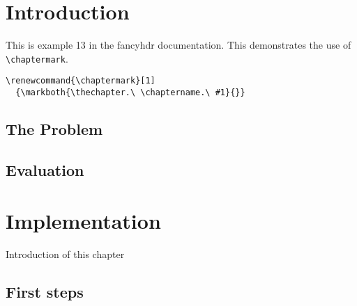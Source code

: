 \documentclass{book}
\renewcommand{\chaptermark}[1]
  {\markboth{\thechapter.\ \chaptername.\ #1}{}}
\begin{document}
\chapter{Introduction}

\begin{boxedminipage}{\textwidth}
This is example 13 in the fancyhdr documentation. 
This demonstrates the use of \verb|\chaptermark|.
\begin{verbatim}
\renewcommand{\chaptermark}[1]
  {\markboth{\thechapter.\ \chaptername.\ #1}{}}
\end{verbatim}
\end{boxedminipage}

\section{The Problem}
\label{sec:problem}

\lipsum[1]

\section{Evaluation}

\lipsum[2]

\chapter{Implementation}

Introduction of this chapter

\lipsum[3]

\section{First steps}
\label{sec:first-steps}

\lipsum
\end{document}
